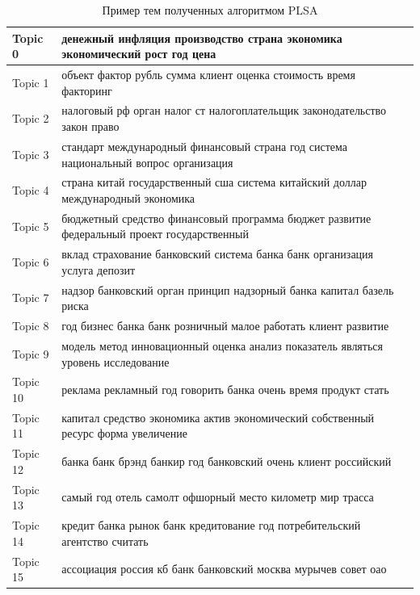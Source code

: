 \documentclass[a4paper, 14pt]{extarticle}
\begin{document}
\begin{landscape}
	\begin{small}
		\begin{singlespace}
		
		\begin{table}[h]
		\centering
		\caption{Пример тем полученных алгоритмом PLSA}
		\label{my-label}
		\begin{tabular}{|l|l|}
		\hline
			Topic 0 &  денежный инфляция производство страна экономика экономический рост год цена \\ \hline
			Topic 1 &  объект фактор рубль сумма клиент оценка стоимость время факторинг \\ \hline
			Topic 2 &  налоговый рф орган налог ст налогоплательщик законодательство закон право \\ \hline
			Topic 3 &  стандарт международный финансовый страна год система национальный вопрос организация \\ \hline
			Topic 4 &  страна китай государственный сша система китайский доллар международный экономика \\ \hline
			Topic 5 &  бюджетный средство финансовый программа бюджет развитие федеральный проект государственный \\ \hline
			Topic 6 &  вклад страхование банковский система банка банк организация услуга депозит \\ \hline
			Topic 7 &  надзор банковский орган принцип надзорный банка капитал базель риска \\ \hline
			Topic 8 &  год бизнес банка банк розничный малое работать клиент развитие \\ \hline
			Topic 9 &  модель метод инновационный оценка анализ показатель являться уровень исследование \\ \hline
			Topic 10 &  реклама рекламный год говорить банка очень время продукт стать \\ \hline
			Topic 11 &  капитал средство экономика актив экономический собственный ресурс форма увеличение \\ \hline
			Topic 12 &  банка банк брэнд банкир год банковский очень клиент российский \\ \hline
			Topic 13 &  самый год отель самолт офшорный место километр мир трасса \\ \hline
			Topic 14 &  кредит банка рынок банк кредитование год потребительский агентство считать \\ \hline
			Topic 15 &  ассоциация россия кб банк банковский москва мурычев совет оао \\ \hline

\end{tabular}
\end{table}
\end{singlespace}
\end{small}
\end{landscape}
\end{document}
